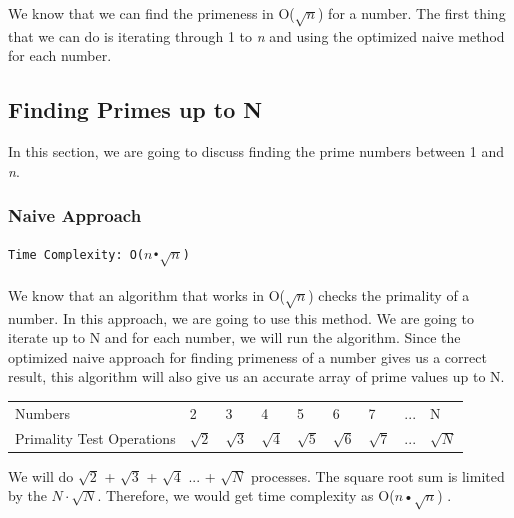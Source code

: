 \documentclass[12pt]{article}
\begin{document}
We know that we can find the primeness in O($\sqrt{n}$) for a number. The first thing that we can do is iterating through 1 to \textit{n} and using the optimized naive method for each number.


\subsection{Finding Primes up to N}
In this section, we are going to discuss finding the prime numbers between 1 and \textit{n}.

\subsubsection{Naive Approach}
\texttt{Time Complexity: O($n$•$\sqrt{n}$) } \\ \\
We know that an algorithm that works in O($\sqrt{n}$) checks the primality of a number. In this approach, we are going to use this method. We are going to iterate up to N and for each number, we will run the algorithm. Since the optimized naive approach for finding primeness of a number gives us a correct result, this algorithm will also give us an accurate array of prime values up to N.

\begin{table}[H]
\begin{tabular}{lllllllll}
Numbers & 2    & 3     & 4     & 5     & 6     & 7     & ...     & N     \\
Primality Test Operations & $\sqrt{2}$  & $\sqrt{3}$    & $\sqrt{4}$     & $\sqrt{5}$    & $\sqrt{6}$    & $\sqrt{7}$ & ...  & $\sqrt{N}$     \\
\end{tabular}
\end{table}
We will do $\sqrt{2}$ +  $\sqrt{3}$ +  $\sqrt{4}$ ... +  $\sqrt{N}$ processes. The square root sum is limited by the $N\cdot\sqrt{N}$. Therefore, we would get time complexity as O($n$•$\sqrt{n}$) \cite{sqrtsumformula}.
\end{document}
